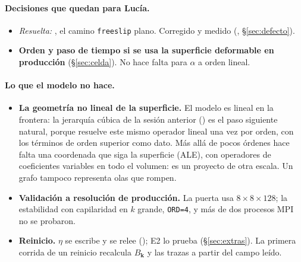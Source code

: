 \paragraph{Decisiones que quedan para Lucía.}
\begin{itemize}
\item \emph{Resuelta:} , el camino \texttt{freeslip} plano. Corregido y medido
  (, §\ref{sec:defecto}).
\item \textbf{Orden y paso de tiempo si se usa la superficie deformable en producción}
  (§\ref{sec:celda}). No hace falta para $\alpha$ a orden lineal.
\end{itemize}

\paragraph{Lo que el modelo no hace.}
\begin{itemize}
\item \textbf{La geometría no lineal de la superficie.} El modelo es lineal en la frontera:
  la jerarquía cúbica de la sesión anterior
  () es el paso siguiente natural,
  porque resuelve este mismo operador lineal una vez por orden, con los términos de orden
  superior como dato. Más allá de pocos órdenes hace falta una coordenada que siga la
  superficie (ALE), con operadores de coeficientes variables en todo el volumen: es un
  proyecto de otra escala. Un grafo tampoco representa olas que rompen.
\item \textbf{Validación a resolución de producción.} La puerta usa $8\times8\times128$; la
  estabilidad con capilaridad en $k$ grande, \texttt{ORD=4}, y más de dos procesos MPI no se
  probaron.
\item \textbf{Reinicio.} $\eta$ se escribe y se relee (); E2 lo
  prueba (§\ref{sec:extras}). La primera corrida de un reinicio recalcula $B_{\mathbf k}$ y
  las trazas a partir del campo leído.
\end{itemize}


